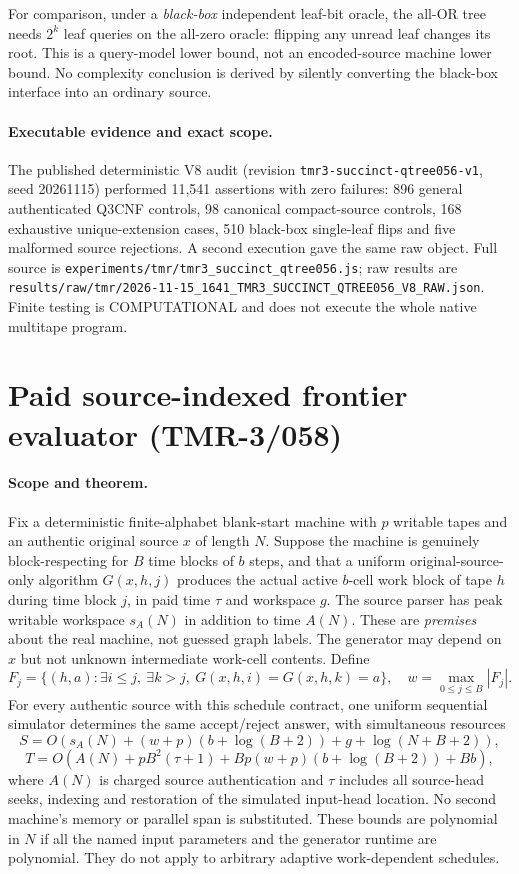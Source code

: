 \documentclass[11pt]{article}
\begin{document}
For comparison, under a \emph{black-box} independent leaf-bit
oracle, the all-OR tree needs $2^k$ leaf queries on the
all-zero oracle: flipping any unread leaf changes its root.
This is a query-model lower bound, not an encoded-source machine
lower bound. No complexity conclusion is derived by silently
converting the black-box interface into an ordinary source.

\paragraph{Executable evidence and exact scope.}
The published deterministic V8 audit (revision
\texttt{tmr3-succinct-qtree056-v1}, seed 20261115) performed
11,541 assertions with zero failures: 896 general authenticated
Q3CNF controls, 98 canonical compact-source controls,
168 exhaustive unique-extension cases, 510 black-box single-leaf
flips and five malformed source rejections. A second execution
gave the same raw object. Full source is
\texttt{experiments/tmr/tmr3\_succinct\_qtree056.js};
raw results are
\texttt{results/raw/tmr/2026-11-15\_1641\_TMR3\_SUCCINCT\_QTREE056\_V8\_RAW.json}.
Finite testing is COMPUTATIONAL and does not execute the whole
native multitape program.


\section{Paid source-indexed frontier evaluator (TMR-3/058)}
\paragraph{Scope and theorem.}
Fix a deterministic finite-alphabet blank-start machine with $p$
writable tapes and an authentic original source $x$ of length $N$.
Suppose the machine is genuinely block-respecting for $B$ time
blocks of $b$ steps, and that a uniform original-source-only
algorithm $G(x,h,j)$ produces the actual active $b$-cell work
block of tape $h$ during time block $j$, in paid time $\tau$ and
workspace $g$. The source parser has peak writable workspace $s_A(N)$ in addition to time $A(N)$. These are \emph{premises} about the real machine,
not guessed graph labels. The generator may depend on $x$ but
not unknown intermediate work-cell contents. Define
\[
F_j=\{(h,a):\exists i\le j,\ \exists k>j,\
G(x,h,i)=G(x,h,k)=a\},\quad
w=\max_{0\le j\le B}|F_j|.
\]
For every authentic source with this schedule contract, one
uniform sequential simulator determines the same accept/reject
answer, with simultaneous resources
\[
S=O(s_A(N)+(w+p)(b+\log(B+2))+g+\log(N+B+2)),
\]
\[
T=O(A(N)+pB^2(\tau+1)+
Bp(w+p)(b+\log(B+2))+Bb),
\]
where $A(N)$ is charged source authentication and $\tau$ includes
all source-head seeks, indexing and restoration of the simulated
input-head location. No second machine's memory or parallel span
is substituted. These bounds are polynomial in $N$ if all the
named input parameters and the generator runtime are polynomial.
They do not apply to arbitrary adaptive work-dependent schedules.
\end{document}
